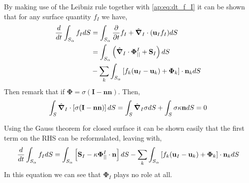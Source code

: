 By making use of the Leibniz rule together with \ref{ap:eq:dt_f_I} it can be shown that for any surface quantity $f_I$ we have, 
\begin{align*}
    \frac{d}{d t} \int_{S_\alpha} f_I dS
    &= \int_{S_\alpha} \frac{\partial}{\partial t} f_I 
    + \hat{\bm{\nabla}}_I \cdot (\textbf{u}_If_I) dS\\
    &= \int_{S_\alpha} \left(
        \hat{\bm{\nabla}}_I \cdot \mathbf{\Phi}_{||}^I
        + \textbf{S}_I
    \right) dS\\
    & - \sum_k \int_{S_\alpha} \left[
        f_k (\textbf{u}_I - \textbf{u}_k)
        + \mathbf{\Phi}_k
    \right] \cdot \textbf{n}_k
    dS
\end{align*}
Then remark that if $\mathbf{\Phi} = \sigma (\textbf{I}-\textbf{nn})$.
Then, 
\begin{equation*}
    \int_S \hat{\bm{\nabla}}_I \cdot \left[\sigma (\textbf{I} - \textbf{nn})\right]dS 
    =
    \int_S  \hat{\bm{\nabla}}_I \sigma dS 
    + \int_S \sigma \kappa \textbf{n}dS 
    = 0
\end{equation*}

Using the Gauss theorem for closed surface it can be shown easily that the first term on the RHS can be reformulated, leaving with, 
\begin{align}
    \frac{d}{d t} \int_{S_\alpha} f_I dS
    = \int_{S_\alpha} \left[
        \textbf{S}_I 
        - \kappa \mathbf{\Phi}_{||}^I\cdot \textbf{n} 
    \right]dS
    - \sum_k \int_{S_\alpha} \left[
        f_k (\textbf{u}_I - \textbf{u}_k)
        + \mathbf{\Phi}_k
    \right] \cdot \textbf{n}_k
    dS
\end{align}
In this equation we can see that $\mathbf{\Phi}_I$ plays no role at all. 

